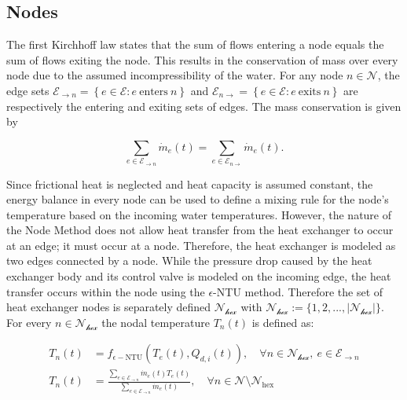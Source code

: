 \subsection{Nodes}
The first Kirchhoff law states that the sum of flows entering a node equals the sum of flows exiting the node. This results in the conservation of mass over every node due to the assumed incompressibility of the water. For any node $n \in \mathcal{N}$, the edge sets $\mathcal{E}_{\rightarrow n} = \left\{ e \in \mathcal{E} : e \  \text{enters} \ n\right\}$ and $\mathcal{E}_{n\rightarrow } = \left\{ e \in \mathcal{E} : e \  \text{exits} \ n\right\}$ are respectively the entering and exiting sets of edges. The mass conservation is given by

\begin{equation}
    \sum_{e  \in \mathcal{E}_{\rightarrow n}} \dot{m}_e(t) = \sum_{e  \in \mathcal{E}_{n \rightarrow}} \dot{m}_e(t).
\end{equation}

Since frictional heat is neglected and heat capacity is assumed constant, the energy balance in every node can be used to define a mixing rule for the node's temperature based on the incoming water temperatures. However, the nature of the Node Method does not allow heat transfer from the heat exchanger to occur at an edge; it must occur at a node. Therefore, the heat exchanger is modeled as two edges connected by a node. While the pressure drop caused by the heat exchanger body and its control valve is modeled on the incoming edge, the heat transfer occurs within the node using the $\epsilon$-NTU method. Therefore the set of heat exchanger nodes is separately defined $\mathcal{N_{\text{hex}}}$ with $\mathcal{N_{\text{hex}}} := \{1,2, ..., |\mathcal{N_{\text{hex}}}|\}$. For every $n \in \mathcal{N_{\text{hex}}}$ the nodal temperature $T_n(t)$ is defined as:

\begin{align}
    T_n(t) &= f_{\epsilon-\text{NTU}}(T_e(t),Q_{d,i}(t)), \quad \forall n \in  \mathcal{N_{\text{hex}}}, \ e  \in \mathcal{E}_{\rightarrow n} \label{eq::NTUnodes} \\
    T_n(t) &= \frac{\sum_{e  \in \mathcal{E}_{\rightarrow n}} \dot{m}_e(t) T_e(t)}{\sum_{e  \in \mathcal{E}_{\rightarrow n}} \dot{m}_e(t)}, \quad \forall n \in \mathcal{N} \setminus \mathcal{N}_{\text{hex}} \label{eq::TempMix}
\end{align}


